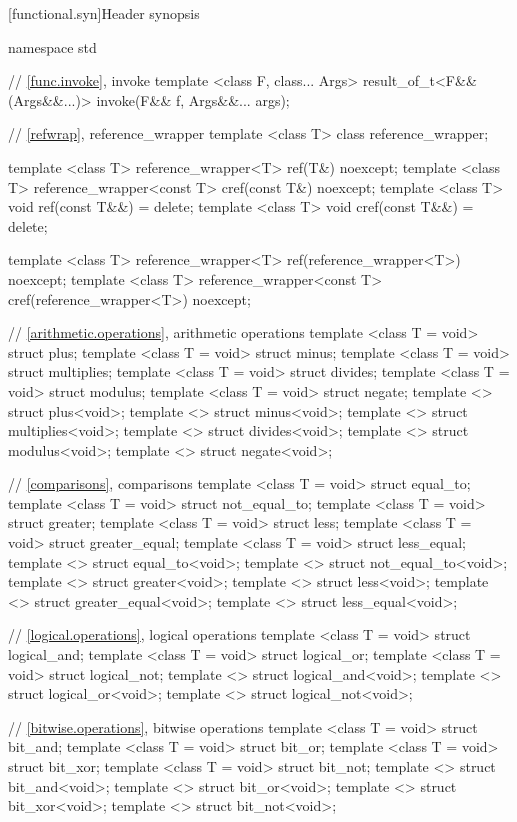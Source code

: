 [functional.syn]{Header  synopsis}

%
%
\begin{codeblock}
namespace std {
  // \ref{func.invoke}, invoke
  template <class F, class... Args>
    result_of_t<F&&(Args&&...)> invoke(F&& f, Args&&... args);

  // \ref{refwrap}, reference_wrapper
  template <class T> class reference_wrapper;

  template <class T> reference_wrapper<T> ref(T&) noexcept;
  template <class T> reference_wrapper<const T> cref(const T&) noexcept;
  template <class T> void ref(const T&&) = delete;
  template <class T> void cref(const T&&) = delete;

  template <class T> reference_wrapper<T> ref(reference_wrapper<T>) noexcept;
  template <class T> reference_wrapper<const T> cref(reference_wrapper<T>) noexcept;

  // \ref{arithmetic.operations}, arithmetic operations
  template <class T = void> struct plus;
  template <class T = void> struct minus;
  template <class T = void> struct multiplies;
  template <class T = void> struct divides;
  template <class T = void> struct modulus;
  template <class T = void> struct negate;
  template <> struct plus<void>;
  template <> struct minus<void>;
  template <> struct multiplies<void>;
  template <> struct divides<void>;
  template <> struct modulus<void>;
  template <> struct negate<void>;

  // \ref{comparisons}, comparisons
  template <class T = void> struct equal_to;
  template <class T = void> struct not_equal_to;
  template <class T = void> struct greater;
  template <class T = void> struct less;
  template <class T = void> struct greater_equal;
  template <class T = void> struct less_equal;
  template <> struct equal_to<void>;
  template <> struct not_equal_to<void>;
  template <> struct greater<void>;
  template <> struct less<void>;
  template <> struct greater_equal<void>;
  template <> struct less_equal<void>;

  // \ref{logical.operations}, logical operations
  template <class T = void> struct logical_and;
  template <class T = void> struct logical_or;
  template <class T = void> struct logical_not;
  template <> struct logical_and<void>;
  template <> struct logical_or<void>;
  template <> struct logical_not<void>;

  // \ref{bitwise.operations}, bitwise operations
  template <class T = void> struct bit_and;
  template <class T = void> struct bit_or;
  template <class T = void> struct bit_xor;
  template <class T = void> struct bit_not;
  template <> struct bit_and<void>;
  template <> struct bit_or<void>;
  template <> struct bit_xor<void>;
  template <> struct bit_not<void>;

}
\end{codeblock}
